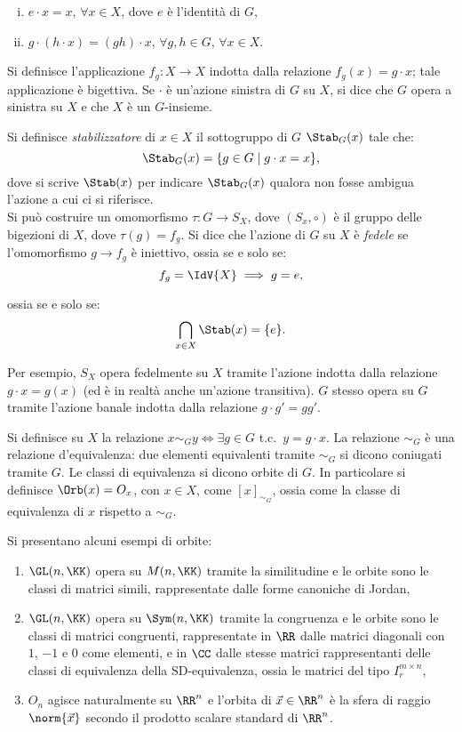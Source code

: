 \documentclass[10pt,landscape]{article}
\begin{document}
\begin{multicols}{3}
		\begin{enumerate}[(i)]
			\item $e \cdot x=x$, $\forall x \in X$, dove $e$ è l'identità di $G$,
			\item $g \cdot (h \cdot x)=(gh) \cdot x$, $\forall g, h \in G$, $\forall x \in X$.
		\end{enumerate}

		Si definisce l'applicazione $f_g:X\rightarrow X$ indotta dalla relazione $f_g(x)=g \cdot x$; tale applicazione è bigettiva. Se $\cdot$ è un'azione sinistra di $G$ su $X$, si dice che $G$ opera a sinistra su $X$ e che $X$ è un $G$-insieme. \\
		
		\vskip 0.05in
		
		Si definisce \textit{stabilizzatore} di $x \in X$ il sottogruppo di $G$ $\Stab_G(x)$
		tale che:
		\[ \Stab_G(x)= \{g\in G \mid g \cdot x=x\}, \]
		dove si scrive $\Stab(x)$ per indicare $\Stab_G(x)$ qualora non fosse ambigua
		l'azione a cui ci si riferisce. \\

		Si può costruire un omomorfismo $\tau : G \rightarrow S_X$, dove $(S_x, \circ)$ è il gruppo delle bigezioni di $X$, dove $\tau(g) = f_g$. Si dice che l'azione di $G$ su $X$ è \textit{fedele} se l'omomorfismo $g \rightarrow f_g$ è iniettivo, ossia
		se e solo se:
		\[ f_g = \IdV{X} \implies g = e, \]
		
		ossia se e solo se:
		\[ \bigcap_{x \in X} \Stab(x) = \{e\}. \]
		
		Per esempio, $S_X$ opera fedelmente su $X$ tramite l'azione indotta dalla relazione $g \cdot x=g(x)$ (ed è in realtà anche un'azione transitiva). $G$ stesso opera su $G$
		tramite l'azione banale indotta dalla relazione $g \cdot g'=gg'$.
		
		Si definisce su $X$ la relazione $x \sim_G y \iff \exists g \in G$ t.c.~$y=g \cdot x$.
		La relazione $\sim_G$ è una relazione d'equivalenza: due elementi equivalenti tramite $\sim_G$ si dicono coniugati tramite $G$. Le classi di equivalenza si dicono orbite di $G$. In particolare si definisce $\Orb(x) = O_x$, con $x \in X$, come $[x]_{\sim_G}$,
		ossia come la classe di equivalenza di $x$ rispetto a $\sim_G$.
		
		Si presentano alcuni esempi di orbite:
		\begin{enumerate}
			\item $\GL(n,\KK)$ opera su $M(n,\KK)$ tramite la similitudine e le orbite sono le classi di matrici simili, rappresentate dalle forme canoniche di Jordan,
			\item $\GL(n,\KK)$ opera su $\Sym(n,\KK)$ tramite la congruenza e le orbite sono le classi di matrici congruenti, rappresentate in $\RR$ dalle matrici diagonali con $1$, $-1$ e $0$ come elementi, e in $\CC$ dalle stesse matrici rappresentanti delle classi
			di equivalenza della SD-equivalenza, ossia le matrici del tipo $I_r^{m \times n}$,
			\item $O_n$ agisce naturalmente su $\RR^n$ e l'orbita di $\vec x \in \RR^n$ è la sfera di raggio $\norm{\vec x}$ secondo il prodotto scalare standard di $\RR^n$. 
		\end{enumerate}
		

\end{multicols}
\end{document}

